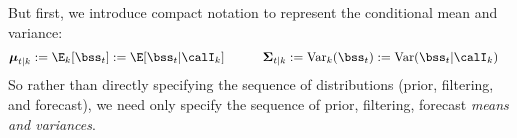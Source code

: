 \documentclass[12pt]{article}
\theoremstyle{plain}
\theoremstyle{definition}
\theoremstyle{remark}
\newcommand{\bsmu}{\boldsymbol{\mu}}
\newcommand{\bsSigma}{\boldsymbol{\Sigma}}
\begin{document}
But first, we introduce compact notation to represent the conditional
mean and variance:
\begin{align}
  \bsmu_{t|k} &:=
  \E_{k}[\bss_t] :=
  \E[\bss_t|\calI_k]
  \qquad\quad
  \bsSigma_{t|k} :=
  \text{Var}_{k}(\bss_t) :=
  \text{Var}(\bss_t|\calI_k)
  \label{kalnot}
\end{align}
So rather than directly specifying the sequence of distributions (prior,
filtering, and forecast), we need only specify the sequence of prior,
filtering, forecast \emph{means and variances}.
\end{document}
